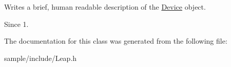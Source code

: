 Writes a brief, human readable description of the \hyperlink{class_leap_1_1_device}{Device} object.


\begin{DoxyCodeInclude}
\end{DoxyCodeInclude}


\begin{DoxySince}{Since}
1. 
\end{DoxySince}


The documentation for this class was generated from the following file\+:\begin{DoxyCompactItemize}
\item 
sample/include/Leap.\+h\end{DoxyCompactItemize}
